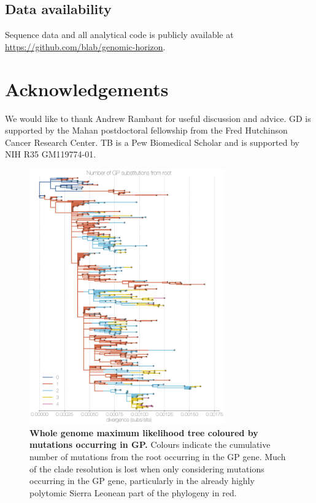\documentclass[11pt,oneside,letterpaper]{article}
\begin{document}
\subsection*{Data availability}
Sequence data and all analytical code is publicly available at \url{https://github.com/blab/genomic-horizon}.

\section*{Acknowledgements}
We would like to thank Andrew Rambaut for useful discussion and advice.
GD is supported by the Mahan postdoctoral fellowship from the Fred Hutchinson Cancer Research Center.
TB is a Pew Biomedical Scholar and is supported by NIH R35 GM119774-01.




\newpage

\setcounter{figure}{0}
\setcounter{table}{0}
\renewcommand{\thefigure}{S\arabic{figure}}
\renewcommand{\thetable}{S\arabic{table}}


\begin{figure}[h]
 \centering
	\includegraphics[width=0.75\textwidth]{supp_figures/sfigX_embedding.png}
	\caption{\textbf{Whole genome maximum likelihood tree coloured by mutations occurring in GP.}
  Colours indicate the cumulative number of mutations from the root occurring in the GP gene.
  Much of the clade resolution is lost when only considering mutations occurring in the GP gene, particularly in the already highly polytomic Sierra Leonean part of the phylogeny in red.
	}
	\label{embedding}
\end{figure}
\end{document}

